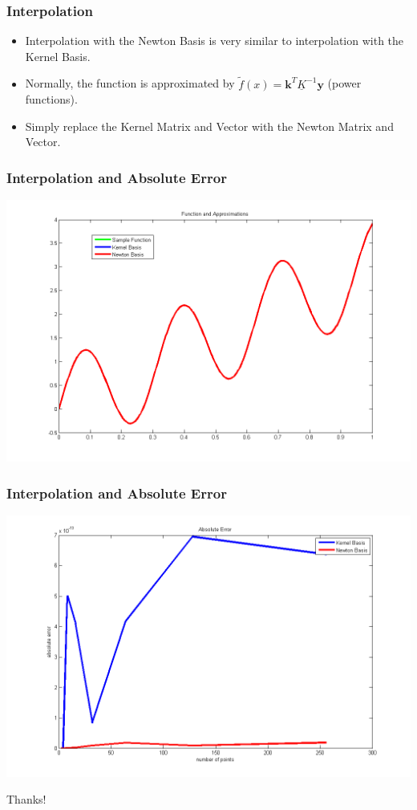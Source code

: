\documentclass{beamer}
\begin{document}
\begin{frame}
\frametitle{Interpolation}
\begin{itemize}
\item Interpolation with the Newton Basis is very similar to interpolation with the Kernel Basis.
\item Normally, the function is approximated by $\tilde{f}(x)=\textbf{k}^{T}\underline{K}^{-1}\textbf{y}$ (power functions).
\item Simply replace the Kernel Matrix and Vector with the Newton Matrix and Vector.
\end{itemize}
\end{frame}

\begin{frame}
\frametitle{Interpolation and Absolute Error}
\includegraphics[scale = .45]{functionAppx}
\end{frame}

\begin{frame}
\frametitle{Interpolation and Absolute Error}
\includegraphics[scale =.45]{functionError}
\end{frame}


\begin{frame}
\Huge{\centerline{Thanks!}}
\end{frame}

\end{document}
